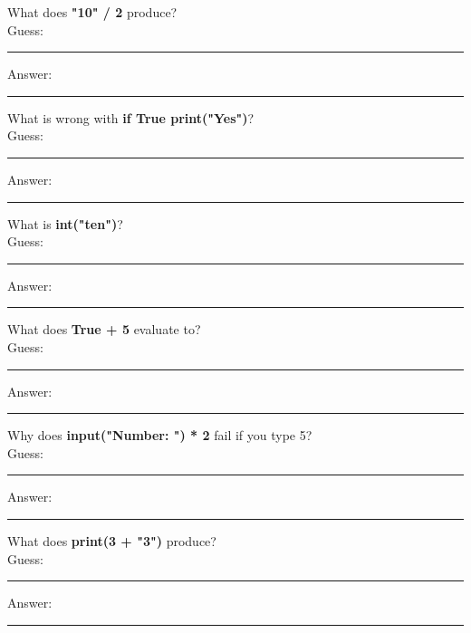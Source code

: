\documentclass{article}
\begin{document}
\begin{tasks}[
    style=enumerate,
    label-format=\bfseries,
    label-width=1.5em,
    item-indent=2em,
    column-sep=1em,
    after-item-skip=2em
  ]
        \task What does \textbf{"10" / 2} produce?  \\
        Guess:  \vspace{3mm}\\
        \rule{\linewidth}{0.4pt} %
        Answer:  \vspace{3mm}\\
        \rule{\linewidth}{0.4pt} %

        \task What is wrong with \textbf{if True print("Yes")}?  \\
        Guess:  \vspace{3mm}\\
        \rule{\linewidth}{0.4pt} %
        Answer:  \vspace{3mm}\\
        \rule{\linewidth}{0.4pt} %

        \task What is \textbf{int("ten")}?  \\
        Guess:  \vspace{3mm}\\
        \rule{\linewidth}{0.4pt} %
        Answer:  \vspace{3mm}\\
        \rule{\linewidth}{0.4pt} %

        \task What does \textbf{True + 5} evaluate to?  \\
        Guess:  \vspace{3mm}\\
        \rule{\linewidth}{0.4pt} %
        Answer:  \vspace{3mm}\\
        \rule{\linewidth}{0.4pt} %

        \task Why does \textbf{input("Number: ") * 2} fail if you type 5?  \\
        Guess:  \vspace{3mm}\\
        \rule{\linewidth}{0.4pt} %
        Answer:  \vspace{3mm}\\
        \rule{\linewidth}{0.4pt} %

        \task What does \textbf{print(3 + "3")} produce?  \\
        Guess:  \vspace{3mm}\\
        \rule{\linewidth}{0.4pt} %
        Answer:  \vspace{3mm}\\
        \rule{\linewidth}{0.4pt} %


\end{tasks}
\end{document}
